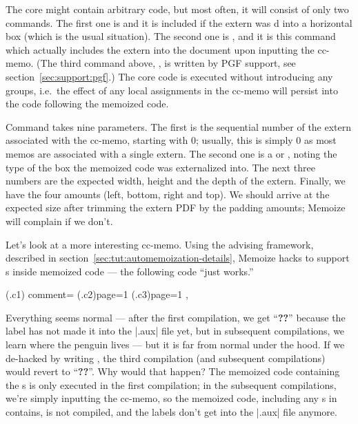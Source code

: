 \documentclass[a4paper,11pt]{article}
\begin{document}
The core might contain arbitrary code, but most often, it will consist of only
two commands.  The first one is  and it is included if the
extern was d into a horizontal box (which is the usual
situation).  The second one is , and it is this
command which actually includes the extern into the document upon inputting the
cc-memo.  (The third command above, , is written
by PGF support, see section~\ref{sec:support:pgf}.) The core code is executed
without introducing any groups, i.e.\ the effect of any local assignments in
the cc-memo will persist into the code following the memoized code.

Command  takes nine parameters.  The first is the
sequential number of the extern associated with the cc-memo, starting with 0;
usually, this is simply 0 as most memos are associated with a single extern.
The second one is a  or , noting the type of the box
the memoized code was externalized into.  The next three numbers are the
expected width, height and the depth of the extern.  Finally, we have the four
 amounts (left, bottom, right and top).  We should arrive at
the expected size after trimming the extern PDF by the
padding amounts; Memoize will complain if we don't.

Let's look at a more interesting cc-memo.  Using the advising framework,
described in section~\ref{sec:tut:automemoization-details}, Memoize hacks
 to support s inside memoized code --- the following
code ``just works.''

(.c1){
  comment={\centering
    \quad
    (.c2){page=1}\quad
    (.c3){page=1}
  },
}

Everything seems normal --- after the first compilation, we get ``\textbf{??}''
because the label has not made it into the |.aux| file yet, but in subsequent
compilations, we learn where the penguin lives --- but it is far from normal
under the hood. If we de-hacked  by writing
, the third compilation
(and subsequent compilations) would revert to ``\textbf{??}''.  Why would that
happen?  The memoized code containing the s is only executed in the
first compilation; in the subsequent compilations, we're simply inputting the
cc-memo, so the memoized code, including any s in contains, is not
compiled, and the labels don't get into the |.aux| file anymore.
\end{document}
